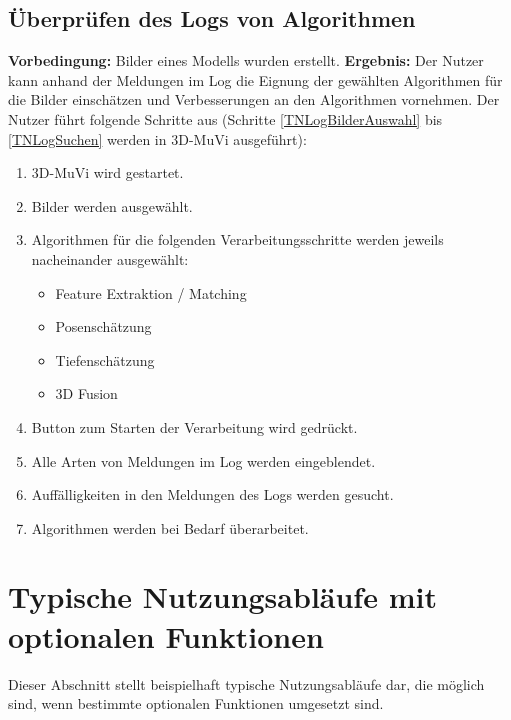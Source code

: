 \subsection{Überprüfen des Logs von Algorithmen}
\textbf{Vorbedingung:} Bilder eines Modells wurden erstellt. \newline
\textbf{Ergebnis:} Der Nutzer kann anhand der Meldungen im Log die Eignung der gewählten Algorithmen für die Bilder einschätzen und Verbesserungen an den Algorithmen vornehmen. \newline
Der Nutzer führt folgende Schritte aus (Schritte \ref{TNLogBilderAuswahl} bis \ref{TNLogSuchen} werden in 3D-MuVi ausgeführt):
\begin{enumerate}
	\item 3D-MuVi wird gestartet.
	\item \label{TNLogBilderAuswahl} Bilder werden ausgewählt.
	\item Algorithmen für die folgenden Verarbeitungsschritte werden jeweils nacheinander ausgewählt:
	\begin{itemize}
		\item Feature Extraktion / Matching
		\item Posenschätzung
		\item Tiefenschätzung
		\item 3D Fusion
	\end{itemize}
	\item Button zum Starten der Verarbeitung wird gedrückt.
	\item Alle Arten von Meldungen im Log werden eingeblendet.
	\item \label{TNLogSuchen} Auffälligkeiten in den Meldungen des Logs werden gesucht.
	\item Algorithmen werden bei Bedarf überarbeitet.
\end{enumerate}

\section{Typische Nutzungsabläufe mit optionalen Funktionen}

Dieser Abschnitt stellt beispielhaft typische Nutzungsabläufe dar, die möglich sind, wenn bestimmte optionalen Funktionen umgesetzt sind.

